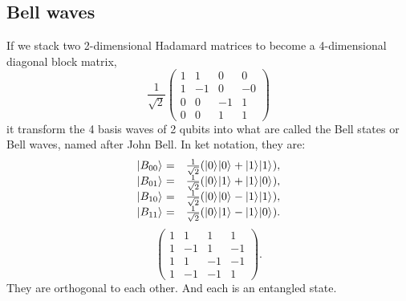 \documentclass[oneside, letter, 12pt]{book}
\begin{document}
\subsection{Bell waves}
If we stack two 2-dimensional Hadamard matrices to become a 4-dimensional diagonal block matrix,
\begin{equation}
\frac 1 {\sqrt{2}}
  \begin{pmatrix}
    1 & 1 & 0 & 0 \\
    1 & -1 & 0 & -0 \\
    0 & 0 & -1 & 1 \\
    0 & 0 & 1 & 1
    \end{pmatrix}
\end{equation}
it transform the 4 basis waves of 2 qubits into what are called the Bell states or Bell waves, named after John Bell. In ket notation, they are:
\begin{equation}
\begin{array}{rl}
    \vert {B_{00}} \rangle_{} =& \frac 1 {\sqrt 2} (\vert {0} \rangle_{}\vert {0} \rangle_{}+\vert {1} \rangle_{}\vert {1} \rangle_{}),\\
    \vert {B_{01}} \rangle_{} =& \frac 1 {\sqrt 2} (\vert {0} \rangle_{}\vert {1} \rangle_{}+\vert {1} \rangle_{}\vert {0} \rangle_{}),\\
    \vert {B_{10}} \rangle_{} =& \frac 1 {\sqrt 2} (\vert {0} \rangle_{}\vert {0} \rangle_{}-\vert {1} \rangle_{}\vert {1} \rangle_{}),\\
    \vert {B_{11}} \rangle_{} =& \frac 1 {\sqrt 2} (\vert {0} \rangle_{}\vert {1} \rangle_{}-\vert {1} \rangle_{}\vert {0} \rangle_{}).
\end{array}
\end{equation}
\begin{equation}
\begin{pmatrix} %
    1 & 1 & 1 & 1 \\
    1 & -1 & 1 & -1 \\
    1 & 1 & -1 & -1 \\
    1 & -1 & -1 & 1
    \end{pmatrix}.
\end{equation}
They are orthogonal to each other. And each is an entangled state.
\end{document}
